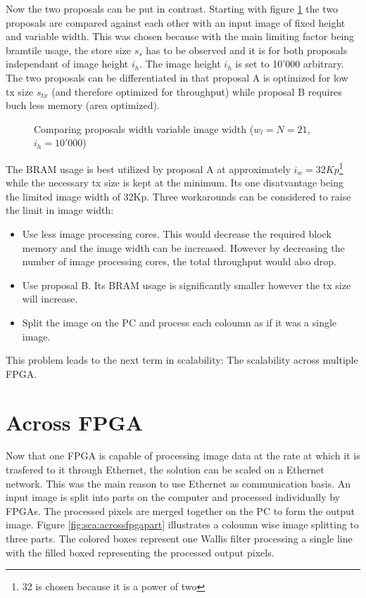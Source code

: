 Now the two proposals can be put in contrast. Starting with figure 
\ref{fig:sca:compfixheight} the two proposals are compared against each other
with an input image of fixed height and variable width. This was chosen because
with the main limiting factor being \gls{bramtile} usage, the store size $s_s$ has to
be observed and it is for both proposals independant of image height $i_h$.
The image height $i_h$ is set to 10'000 arbitrary. The
two proposals can be differentiated in that proposal A is optimized for low tx
size $s_{tx}$ (and therefore optimized for throughput) while proposal B requires
buch less memory (area optimized). 

\begin{figure}[b!]
    \centering
    \begin{adjustbox}{max width=\linewidth}
        
    \end{adjustbox}
    \caption{Comparing proposals width variable image width ($w_l=N=21$,
    $i_h=10'000$)}
    \label{fig:sca:compfixheight}
\end{figure}

\clearpage
The BRAM usage is best utilized by proposal A at approximately
$i_w=32Kp$\footnote{32 is chosen because it is a power of two} while
the necessary tx size is kept at the minimum. Its one disatvantage being the
limited image width of 32Kp. Three workarounds can be considered to raise the
limit in image width:
\begin{itemize}
    \item Use less image processing cores. This would decrease the required
    block memory and the image width can be increased. However by decreasing the
    number of image processing cores, the total throughput would also drop.
    \item Use proposal B. Its BRAM usage is significantly smaller however the tx
    size will increase.
    \item Split the image on the PC and process each coloumn as if it was a
    single image.
\end{itemize}

This problem leads to the next term in scalability: The scalability across
multiple FPGA.


\section{Across FPGA}
Now that one FPGA is capable of processing image data at the rate at which it is
trasfered to it through Ethernet, the solution can be scaled on a Ethernet
network. This
was the main reason to use Ethernet as communication basis. An input image is
split into parts on the computer and processed individually by FPGAs. The
processed pixels are merged together on the PC to form the output image. Figure
\ref{fig:sca:acrossfpgapart} illustrates a coloumn wise image splitting to three
parts. The colored boxes represent one Wallis filter processing a single line
with the filled boxed representing the processed output pixels.

